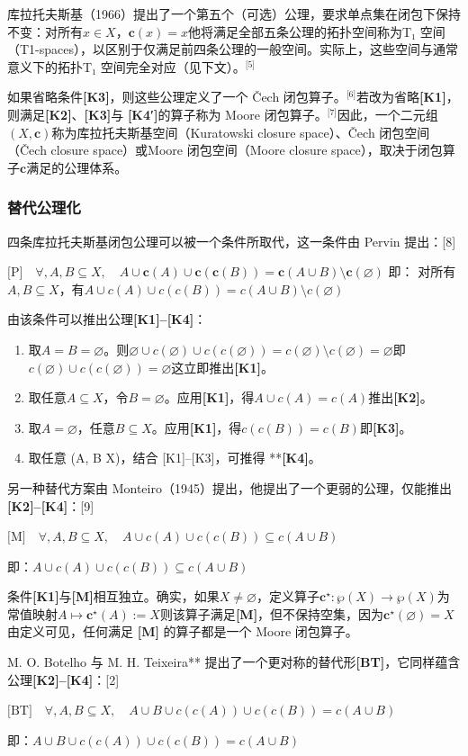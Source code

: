 库拉托夫斯基（1966）提出了一个第五个（可选）公理，要求单点集在闭包下保持不变：对所有$ x \in X $，$\mathbf{c}({x}) = {x}$他将满足全部五条公理的拓扑空间称为T₁ 空间（T1-spaces），以区别于仅满足前四条公理的一般空间。实际上，这些空间与通常意义下的拓扑T₁ 空间完全对应（见下文）。\(^\text{[5]}\)

如果省略条件\textbf{[K3]}，则这些公理定义了一个 Čech 闭包算子。\(^\text{[6]}\)若改为省略\textbf{[K1]}，则满足\textbf{[K2]}、\textbf{[K3]}与 \textbf{[K4′]}的算子称为 Moore 闭包算子。\(^\text{[7]}\)因此，一个二元组$(X, \mathbf{c})$称为库拉托夫斯基空间（Kuratowski closure space）、Čech 闭包空间（Čech closure space）或Moore 闭包空间（Moore closure space），取决于闭包算子$\mathbf{c}$满足的公理体系。
\subsubsection{替代公理化}
四条库拉托夫斯基闭包公理可以被一个条件所取代，这一条件由 Pervin 提出：[8]

$\text{[P]}\quad \forall, A,B \subseteq X, \quad A \cup \mathbf{c}(A) \cup \mathbf{c}(\mathbf{c}(B)) = \mathbf{c}(A \cup B) \setminus \mathbf{c}(\varnothing)$
即：
对所有$A, B \subseteq X$，有$A \cup c(A) \cup c(c(B)) = c(A \cup B) \setminus c(\varnothing)$

由该条件可以推出公理\textbf{[K1]–[K4]}：
\begin{enumerate}
\item 取$A = B = \varnothing$。则$\varnothing \cup c(\varnothing) \cup c(c(\varnothing)) = c(\varnothing) \setminus c(\varnothing) = \varnothing$即$c(\varnothing) \cup c(c(\varnothing)) = \varnothing$这立即推出\textbf{[K1]}。
\item 取任意$A \subseteq X$，令$B = \varnothing$。应用\textbf{[K1]}，得$A \cup c(A) = c(A)$推出\textbf{[K2]}。
\item 取$A = \varnothing$，任意$B \subseteq X$。应用\textbf{[K1]}，得$c(c(B)) = c(B)$即\textbf{[K3]}。
\item 取任意 (A, B \subseteq X)，结合 [K1]–[K3]，可推得 **\textbf{[K4]}。
\end{enumerate}
另一种替代方案由 Monteiro（1945）提出，他提出了一个更弱的公理，仅能推出 \textbf{[K2]–[K4]}：[9]

$\text{[M]}\quad \forall, A,B \subseteq X, \quad A \cup c(A) \cup c(c(B)) \subseteq c(A \cup B)$

即：$A \cup c(A) \cup c(c(B)) \subseteq c(A \cup B)$

条件\textbf{[K1]}与\textbf{[M]}相互独立。确实，如果$X \neq \varnothing$，定义算子$\mathbf{c}^\star : \wp(X) \to \wp(X)$为常值映射$A \mapsto \mathbf{c}^\star(A) := X$则该算子满足\textbf{[M]}，但不保持空集，因为$\mathbf{c}^\star(\varnothing) = X$由定义可见，任何满足 \textbf{[M]} 的算子都是一个 Moore 闭包算子。

M. O. Botelho 与 M. H. Teixeira** 提出了一个更对称的替代形\textbf{[BT]}，它同样蕴含公理\textbf{[K2]–[K4]}：[2]

$\text{[BT]}\quad \forall, A,B \subseteq X, \quad A \cup B \cup c(c(A)) \cup c(c(B)) = c(A \cup B)$

即：$A \cup B \cup c(c(A)) \cup c(c(B)) = c(A \cup B)$

